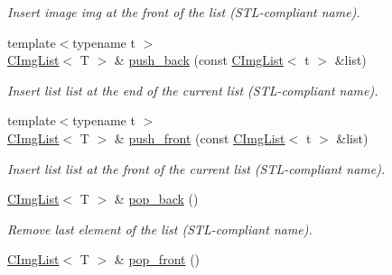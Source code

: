 \begin{DoxyCompactItemize}
\begin{DoxyCompactList}\small\item\em Insert image {\ttfamily img} at the front of the list (STL-\/compliant name). \item\end{DoxyCompactList}\item 
\hypertarget{structcimg__library_1_1CImgList_a61bcce08364e24a78bdc39f53805870c}{
{\footnotesize template$<$typename t $>$ }\\\hyperlink{structcimg__library_1_1CImgList}{CImgList}$<$ T $>$ \& \hyperlink{structcimg__library_1_1CImgList_a61bcce08364e24a78bdc39f53805870c}{push\_\-back} (const \hyperlink{structcimg__library_1_1CImgList}{CImgList}$<$ t $>$ \&list)}
\label{structcimg__library_1_1CImgList_a61bcce08364e24a78bdc39f53805870c}

\begin{DoxyCompactList}\small\item\em Insert list {\ttfamily list} at the end of the current list (STL-\/compliant name). \item\end{DoxyCompactList}\item 
\hypertarget{structcimg__library_1_1CImgList_acc07635982cf6d3fb8f1c59c240e4c6a}{
{\footnotesize template$<$typename t $>$ }\\\hyperlink{structcimg__library_1_1CImgList}{CImgList}$<$ T $>$ \& \hyperlink{structcimg__library_1_1CImgList_acc07635982cf6d3fb8f1c59c240e4c6a}{push\_\-front} (const \hyperlink{structcimg__library_1_1CImgList}{CImgList}$<$ t $>$ \&list)}
\label{structcimg__library_1_1CImgList_acc07635982cf6d3fb8f1c59c240e4c6a}

\begin{DoxyCompactList}\small\item\em Insert list {\ttfamily list} at the front of the current list (STL-\/compliant name). \item\end{DoxyCompactList}\item 
\hypertarget{structcimg__library_1_1CImgList_a727aa097fb39a4de2d28622aa6636f12}{
\hyperlink{structcimg__library_1_1CImgList}{CImgList}$<$ T $>$ \& \hyperlink{structcimg__library_1_1CImgList_a727aa097fb39a4de2d28622aa6636f12}{pop\_\-back} ()}
\label{structcimg__library_1_1CImgList_a727aa097fb39a4de2d28622aa6636f12}

\begin{DoxyCompactList}\small\item\em Remove last element of the list (STL-\/compliant name). \item\end{DoxyCompactList}\item 
\hypertarget{structcimg__library_1_1CImgList_a106291dd41cd3bce27239aac611ef064}{
\hyperlink{structcimg__library_1_1CImgList}{CImgList}$<$ T $>$ \& \hyperlink{structcimg__library_1_1CImgList_a106291dd41cd3bce27239aac611ef064}{pop\_\-front} ()}
\label{structcimg__library_1_1CImgList_a106291dd41cd3bce27239aac611ef064}


\end{DoxyCompactItemize}
